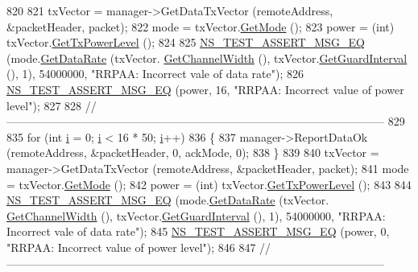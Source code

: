 \begin{DoxyCode}
820 
821   txVector = manager->GetDataTxVector (remoteAddress, &packetHeader, packet);
822   mode = txVector.\hyperlink{classns3_1_1WifiTxVector_a497b1f11cad4b8b26251dfa07c9ad1d6}{GetMode} ();
823   power = (int) txVector.\hyperlink{classns3_1_1WifiTxVector_a7c98bd9609ff1c5cefa6e22d6908a2fe}{GetTxPowerLevel} ();
824 
825   \hyperlink{group__testing_ga2a9d78cffb3db8e867c35fff0b698cf5}{NS\_TEST\_ASSERT\_MSG\_EQ} (mode.\hyperlink{classns3_1_1WifiMode_adcfbe150f69da720db23387f733b8a52}{GetDataRate} (txVector.
      \hyperlink{classns3_1_1WifiTxVector_a1f8bfa51778a3e217581eb665f059564}{GetChannelWidth} (), txVector.\hyperlink{classns3_1_1WifiTxVector_ab80c0fd812542ef337a6cace4f64db63}{GetGuardInterval} (), 1), 54000000, \textcolor{stringliteral}{"RRPAA:
       Incorrect vale of data rate"});
826   \hyperlink{group__testing_ga2a9d78cffb3db8e867c35fff0b698cf5}{NS\_TEST\_ASSERT\_MSG\_EQ} (power, 16, \textcolor{stringliteral}{"RRPAA: Incorrect value of power level"});
827 
828   \textcolor{comment}{//-----------------------------------------------------------------------------------------------------}
829 
835   \textcolor{keywordflow}{for} (\textcolor{keywordtype}{int} \hyperlink{bernuolliDistribution_8m_a6f6ccfcf58b31cb6412107d9d5281426}{i} = 0; \hyperlink{bernuolliDistribution_8m_a6f6ccfcf58b31cb6412107d9d5281426}{i} < 16 * 50; \hyperlink{bernuolliDistribution_8m_a6f6ccfcf58b31cb6412107d9d5281426}{i}++)
836     \{
837       manager->ReportDataOk (remoteAddress, &packetHeader, 0, ackMode, 0);
838     \}
839 
840   txVector = manager->GetDataTxVector (remoteAddress, &packetHeader, packet);
841   mode = txVector.\hyperlink{classns3_1_1WifiTxVector_a497b1f11cad4b8b26251dfa07c9ad1d6}{GetMode} ();
842   power = (int) txVector.\hyperlink{classns3_1_1WifiTxVector_a7c98bd9609ff1c5cefa6e22d6908a2fe}{GetTxPowerLevel} ();
843 
844   \hyperlink{group__testing_ga2a9d78cffb3db8e867c35fff0b698cf5}{NS\_TEST\_ASSERT\_MSG\_EQ} (mode.\hyperlink{classns3_1_1WifiMode_adcfbe150f69da720db23387f733b8a52}{GetDataRate} (txVector.
      \hyperlink{classns3_1_1WifiTxVector_a1f8bfa51778a3e217581eb665f059564}{GetChannelWidth} (), txVector.\hyperlink{classns3_1_1WifiTxVector_ab80c0fd812542ef337a6cace4f64db63}{GetGuardInterval} (), 1), 54000000, \textcolor{stringliteral}{"RRPAA:
       Incorrect vale of data rate"});
845   \hyperlink{group__testing_ga2a9d78cffb3db8e867c35fff0b698cf5}{NS\_TEST\_ASSERT\_MSG\_EQ} (power, 0, \textcolor{stringliteral}{"RRPAA: Incorrect value of power level"});
846 
847   \textcolor{comment}{//-----------------------------------------------------------------------------------------------------}

\end{DoxyCode}
